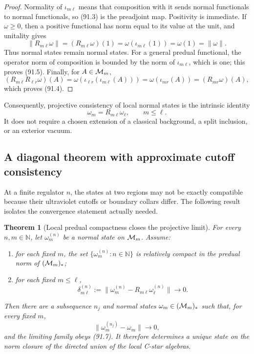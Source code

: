\documentclass[11pt]{article}
\newtheorem{theorem}{Theorem}[section]
\theoremstyle{remark}
\begin{document}
\begin{proof}
Normality of \(\iota_{m\ell}\) means that composition with it sends
normal functionals to normal functionals, so (91.3) is the
preadjoint map.  Positivity is immediate.  If \(\omega\geq0\), then
a positive functional has norm equal to its value at the unit, and
unitality gives
\[
 \|R_{m\ell}\omega\|
 =(R_{m\ell}\omega)(1)
 =\omega(\iota_{m\ell}(1))
 =\omega(1)=\|\omega\|.                                          \tag{91.6}
\]
Thus normal states remain normal states.  For a general predual
functional, the operator norm of composition is bounded by the norm
of \(\iota_{m\ell}\), which is one; this proves (91.5).  Finally,
for \(A\in{\cal M}_m\),
\[
 (R_{m\ell}R_{\ell r}\omega)(A)
 =\omega(\iota_{\ell r}(\iota_{m\ell}(A)))
 =\omega(\iota_{mr}(A))
 =(R_{mr}\omega)(A),
\]
which proves (91.4).
\end{proof}

Consequently, projective consistency of local normal states is the
intrinsic identity
\[
 \omega_m=R_{m\ell}\omega_\ell,\qquad m\leq\ell.                  \tag{91.7}
\]
It does not require a chosen extension of a classical background, a
split inclusion, or an exterior vacuum.

\subsection{A diagonal theorem with approximate cutoff consistency}

At a finite regulator \(n\), the states at two regions may not be
exactly compatible because their ultraviolet cutoffs or boundary
collars differ.  The following result isolates the convergence
statement actually needed.

\begin{theorem}[Local predual compactness closes the projective
limit]
\label{thm:v12v91-projective}
For every \(n,m\in\mathbb N\), let
\(\omega_m^{(n)}\) be a normal state on \({\cal M}_m\).  Assume:

\begin{enumerate}
\item for each fixed \(m\), the set
\(\{\omega_m^{(n)}:n\in\mathbb N\}\) is relatively compact in the
predual norm of \(({\cal M}_m)_*\);
\item for each fixed \(m\leq\ell\),
\[
 \delta_{m\ell}^{(n)}
 :=\|\omega_m^{(n)}-R_{m\ell}\omega_\ell^{(n)}\|
 \longrightarrow0.                                               \tag{91.8}
\]
\end{enumerate}

Then there are a subsequence \(n_j\) and normal states
\(\omega_m\in({\cal M}_m)_*\) such that, for every fixed \(m\),
\[
 \|\omega_m^{(n_j)}-\omega_m\|\longrightarrow0,                  \tag{91.9}
\]
and the limiting family obeys (91.7).  It therefore determines a
unique state on the norm closure of the directed union of the local
C-star algebras.
\end{theorem}
\end{document}
